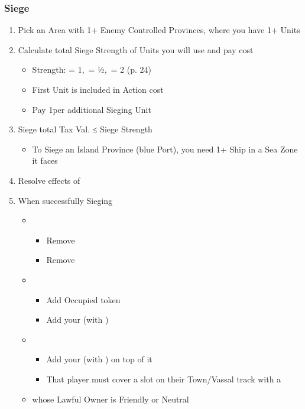 \documentclass[10pt]{article}
\begin{document}
\subsubsection*{Siege }
\begin{enumerate}
	\item Pick an Area with 1+ Enemy Controlled Provinces, where you have 1+ Units
	\item Calculate total Siege Strength of Units you will use and pay \milpower cost
	\begin{itemize}
		\item Strength: \infantry = 1, \cavalry = ½, \artillery = 2 (p. 24)
		\item First Unit is included in Action cost
		\item Pay 1\milpower per additional Sieging Unit
	\end{itemize}
	\item Siege total Tax Val. ≤ Siege Strength
	\begin{itemize}
		\item To Siege an Island Province (blue Port), you need 1+ Ship in a Sea Zone it faces
	\end{itemize}
	\item Resolve effects of 
	\item When successfully Sieging
	\begin{itemize}
		\item {}
		\begin{itemize}
			\item Remove \rebeltown
			\item Remove \unrest
		\end{itemize}
		\item {}
		\begin{itemize}
			\item Add Occupied token
			\item Add your \town (with \unrest)
		\end{itemize}
		\item {}
		\begin{itemize}
			\item Add your \town (with \unrest) on top of it
			\item That player must cover a slot on their Town/Vassal track with a \cube
		\end{itemize}
		\item {} whose Lawful Owner is Friendly or Neutral

\end{itemize}
\end{enumerate}
\end{document}
